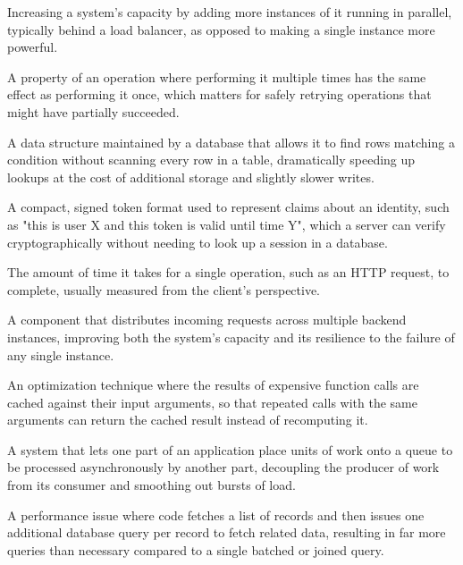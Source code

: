 \documentclass[11pt,a4paper]{report}
\begin{document}
\begin{description}[leftmargin=*,style=nextline]
\item[Horizontal Scaling] Increasing a system's capacity by adding more instances of it running in parallel, typically behind a load balancer, as opposed to making a single instance more powerful.

\item[Idempotency] A property of an operation where performing it multiple times has the same effect as performing it once, which matters for safely retrying operations that might have partially succeeded.

\item[Indexing (Database)] A data structure maintained by a database that allows it to find rows matching a condition without scanning every row in a table, dramatically speeding up lookups at the cost of additional storage and slightly slower writes.

\item[JSON Web Token (JWT)] A compact, signed token format used to represent claims about an identity, such as "this is user X and this token is valid until time Y", which a server can verify cryptographically without needing to look up a session in a database.

\item[Latency] The amount of time it takes for a single operation, such as an HTTP request, to complete, usually measured from the client's perspective.

\item[Load Balancer] A component that distributes incoming requests across multiple backend instances, improving both the system's capacity and its resilience to the failure of any single instance.

\item[Memoization] An optimization technique where the results of expensive function calls are cached against their input arguments, so that repeated calls with the same arguments can return the cached result instead of recomputing it.

\item[Message Queue] A system that lets one part of an application place units of work onto a queue to be processed asynchronously by another part, decoupling the producer of work from its consumer and smoothing out bursts of load.

\item[N+1 Query Problem] A performance issue where code fetches a list of records and then issues one additional database query per record to fetch related data, resulting in far more queries than necessary compared to a single batched or joined query.


\end{description}
\end{document}
